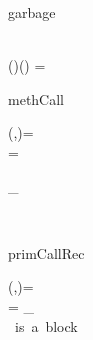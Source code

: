 \begin{RuleFrame}
 


\begin{MetaRule}{garbage}
\begin{consequence}
\ReduceE{
\ctxVal[\Vd{\dvs\ \decs}{\Opt\catch}{\e}]
}{
\ctxVal[\Vd{\decs}{\Opt\catch}{\e}]
}
\end{consequence}
\begin{sideCondition}
\dvs\neq\emptyset\\
\FV(\Vd{\decs}{\e})\cap\dom(\dvs) = \emptyset
\end{sideCondition}
\end{MetaRule}

\begin{MetaRule}{methCall}
\begin{consequence}
\end{consequence}
\begin{sideCondition}
\class(\ctxVal,\val)=\Path\\
\Method\p{}=

{\_}\ \e

\end{sideCondition}
\end{MetaRule}
 
\\[6ex]


\begin{MetaRule}{primCallRec}
\begin{consequence}
\end{consequence}
\begin{sideCondition}
\class(\ctxVal,\val)=\Path\\
\Method\p{}=
{\_}\\
\val\ \mbox{is a block}\\
\end{sideCondition}
\end{MetaRule}
\!\!\!\!\!\!




\end{RuleFrame}
